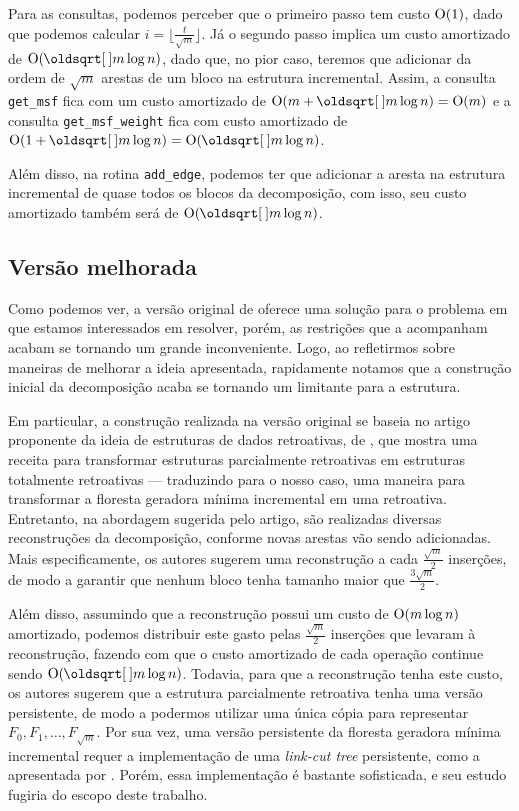 Para as consultas, podemos perceber que o primeiro passo tem custo $\mathrm{O}(1)$, dado que podemos calcular $i = \lfloor \frac{t}{\sqrt{m}} \rfloor$. Já o segundo passo implica um custo amortizado de $\Oh(\sqrt{m} \log n)$, dado que, no pior caso, teremos que adicionar da ordem de $\sqrt{m}$ arestas de um bloco na estrutura incremental. Assim, a consulta \texttt{get\_msf} fica com um custo amortizado de $\Oh(m + \sqrt{m} \log n) = \Oh(m)$ e a consulta \texttt{get\_msf\_weight} fica com custo amortizado de $\Oh(1 + \sqrt{m} \log n) = \Oh(\sqrt{m} \log n)$.

Além disso, na rotina \texttt{add\_edge}, podemos ter que adicionar a aresta na estrutura incremental de quase todos os blocos da decomposição, com isso, seu custo amortizado também será de $\Oh(\sqrt{m} \log n)$.

\subsection{Versão melhorada}
\label{sec:rmsf-versao-mel}

Como podemos ver, a versão original de \citet{10.1093/comjnl/bxaa135} oferece uma solução para o problema em que estamos interessados em resolver, porém, as restrições que a acompanham acabam se tornando um grande inconveniente. Logo, ao refletirmos sobre maneiras de melhorar a ideia apresentada, rapidamente notamos que a construção inicial da decomposição acaba se tornando um limitante para a estrutura.

Em particular, a construção realizada na versão original se baseia no artigo proponente da ideia de estruturas de dados retroativas, de \citet{10.1145/1240233.1240236}, que mostra uma receita para transformar estruturas parcialmente retroativas em estruturas totalmente retroativas --- traduzindo para o nosso caso, uma maneira para transformar a floresta geradora mínima incremental em uma retroativa. Entretanto, na abordagem sugerida pelo artigo, são realizadas diversas reconstruções da decomposição, conforme novas arestas vão sendo adicionadas. Mais especificamente, os autores sugerem uma reconstrução a cada $\frac{\sqrt{m}}{2}$ inserções, de modo a garantir que nenhum bloco tenha tamanho maior que $\frac{3\sqrt{m}}{2}$.

Além disso, assumindo que a reconstrução possui um custo de $\mathrm{O}(m \log n)$ amortizado, podemos distribuir este gasto pelas $\frac{\sqrt{m}}{2}$ inserções que levaram à reconstrução, fazendo com que o custo amortizado de cada operação continue sendo $\Oh(\sqrt{m} \log n)$. Todavia, para que a reconstrução tenha este custo, os autores sugerem que a estrutura parcialmente retroativa tenha uma versão persistente, de modo a  podermos utilizar uma única cópia para representar $F_0, F_1, \dots, F_{\sqrt{m}}$. Por sua vez, uma versão persistente da floresta geradora mínima incremental requer a implementação de uma \emph{link-cut tree} persistente, como a apresentada por \citet{10.1007/978-3-540-69903-3_16}. Porém, essa implementação é bastante sofisticada, e seu estudo fugiria do escopo deste trabalho.

